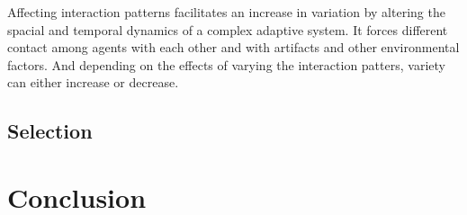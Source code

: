 \documentclass[jou,apacite]{apa6}
\begin{document}
Affecting interaction patterns facilitates an increase in variation by altering the spacial and temporal dynamics of a complex adaptive system.  It forces different contact among agents with each other and with artifacts and other environmental factors.  And depending on the effects of varying the interaction patters, variety can either increase or decrease.

\subsection{Selection}

\section{Conclusion}


\end{document}
